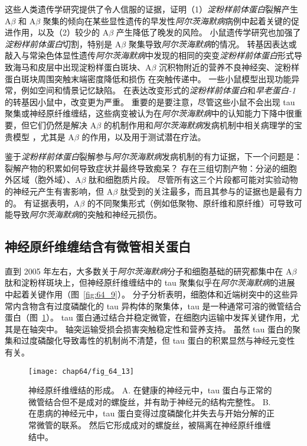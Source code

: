 这些人类遗传学研究提供了令人信服的证据，证明（1）\textit{淀粉样前体蛋白}裂解产生 A$\beta$ 和 A$\beta$ 聚集的倾向在某些显性遗传的早发性\textit{阿尔茨海默病}病例中起着关键的促进作用，以及（2）较少的 A$\beta$ 产生降低了晚发的风险。
小鼠遗传学研究也加强了\textit{淀粉样前体蛋白}切割，特别是 A$\beta$ 聚集导致\textit{阿尔茨海默病}的情况。
转基因表达或敲入与常染色体显性遗传\textit{阿尔茨海默病}中发现的相同的突变\textit{淀粉样前体蛋白}形式导致海马和皮层中出现淀粉样蛋白斑块、A$\beta$ 沉积物附近的营养不良神经突、淀粉样蛋白斑块周围突触末端密度降低和损伤 在突触传递中。
一些小鼠模型出现功能异常，例如空间和情景记忆缺陷。
在表达改变形式的\textit{淀粉样前体蛋白}和\textit{早老蛋白-1}的转基因小鼠中，改变更为严重。
重要的是要注意，尽管这些小鼠不会出现 tau 聚集或神经原纤维缠结，这些病变被认为在\textit{阿尔茨海默病}中的认知能力下降中很重要，但它们仍然是解决 A$\beta$ 的机制作用和\textit{阿尔茨海默病}发病机制中相关病理学的宝贵模型 ，尤其是 A$\beta$ 的作用，以及用于测试潜在疗法。


鉴于\textit{淀粉样前体蛋白}裂解参与\textit{阿尔茨海默病}发病机制的有力证据，下一个问题是：
裂解产物的积累如何导致症状并最终导致痴呆？
存在三组切割产物：分泌的细胞外区域（胞外域）、A$\beta$ 肽和细胞质片段。
尽管所有这三个片段都可能对实验动物的神经元产生有害影响，但 A$\beta$ 肽受到的关注最多，而且其参与的证据也是最有力的。
有证据表明，A$\beta$ 的不同聚集形式（例如低聚物、原纤维和原纤维）可导致可能导致\textit{阿尔茨海默病}的突触和神经元损伤。



\subsection{神经原纤维缠结含有微管相关蛋白}

直到 2005 年左右，大多数关于\textit{阿尔茨海默病}分子和细胞基础的研究都集中在 A$\beta$ 肽和淀粉样斑块上，但神经原纤维缠结中的 tau 聚集似乎在\textit{阿尔茨海默病}的进展中起着关键作用（图~\ref{fig:64_9}）。
分子分析表明，细胞体和近端树突中的这些异常内含物含有过度磷酸化的 tau 异构体的聚集体，tau 是一种通常可溶的微管结合蛋白（图~\ref{fig:64_13}）。
tau 蛋白通过结合并稳定微管，在细胞内运输中发挥关键作用，尤其是在轴突中。
轴突运输受损会损害突触稳定性和营养支持。
虽然 tau 蛋白的聚集和过度磷酸化导致毒性的机制尚不清楚，但 tau 蛋白的积累显然与神经元变性有关。


\begin{figure}[htbp]
	\centering
	\texttt{[image: chap64/fig\_64\_13]}
	\caption{神经原纤维缠结的形成。
		A. 在健康的神经元中，tau 蛋白与正常的微管结合但不是成对的螺旋丝，并有助于神经元的结构完整性。
		B. 在患病的神经元中，tau 蛋白变得过度磷酸化并失去与开始分解的正常微管的联系。
		然后它形成成对的螺旋丝，被隔离在神经原纤维缠结中。}
	\label{fig:64_13}
\end{figure}



